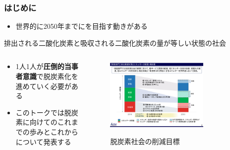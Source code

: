 \begin{frame}
  \frametitle{はじめに}
  
  \pause
  \begin{itemize}
    \item 世界的に2050年までに\textbf{}を目指す動きがある
  \end{itemize}

  \begin{shadequote}[r]{}
    \begin{center}
      排出される二酸化炭素と吸収される二酸化炭素の量が等しい状態の社会
    \end{center}
  \end{shadequote}

  \begin{columns}
    \begin{column}{0.4\textwidth}
      \pause
      \begin{itemize}
        \item 1人1人が\textbf{圧倒的当事者意識}で脱炭素化を進めていく必要がある

        \item このトークでは脱炭素に向けてのこれまでの歩みとこれからについて発表する
      \end{itemize}
    \end{column}
    \begin{column}{0.6\textwidth}
      \begin{figure}[h]
        \centering
        \includegraphics[width=0.75\textwidth]{img/graph.pdf}
        \label{fig:goal_carbon_neutral}
        \caption{脱炭素社会の削減目標\cite{2025_meti}}
      \end{figure}
    \end{column}
  \end{columns}
\end{frame}

